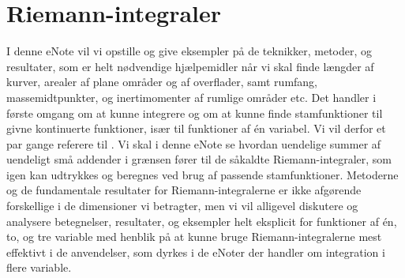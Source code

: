 

\setcounter{chapter}{20} %



%
%
%
%
%



\chapter{Riemann-integraler} \label{tn21}

\begin{basis}
I denne eNote vil vi opstille og give eksempler på de teknikker, metoder, og resultater, som er helt nødvendige hjælpemidler når vi skal finde
længder af kurver, arealer af plane områder og af overflader, samt rumfang, massemidtpunkter, og inertimomenter af rumlige områder etc. Det handler i første omgang om at kunne integrere og om at kunne finde stamfunktioner
til givne kontinuerte funktioner, især til funktioner af \'{e}n variabel. Vi vil derfor et par gange referere til . Vi skal i denne eNote se hvordan uendelige summer af uendeligt små addender i grænsen fører til de såkaldte Riemann-integraler, som igen kan udtrykkes og beregnes ved brug af passende stamfunktioner. Metoderne og de fundamentale resultater for Riemann-integralerne er ikke afgørende forskellige i de dimensioner vi betragter,
men vi vil alligevel diskutere og analysere betegnelser, resultater, og eksempler helt eksplicit for funktioner af \'{e}n, to, og tre variable med henblik på at kunne bruge Riemann-integralerne mest effektivt i de anvendelser, som dyrkes i de eNoter der handler om integration i flere variable.
\end{basis}



